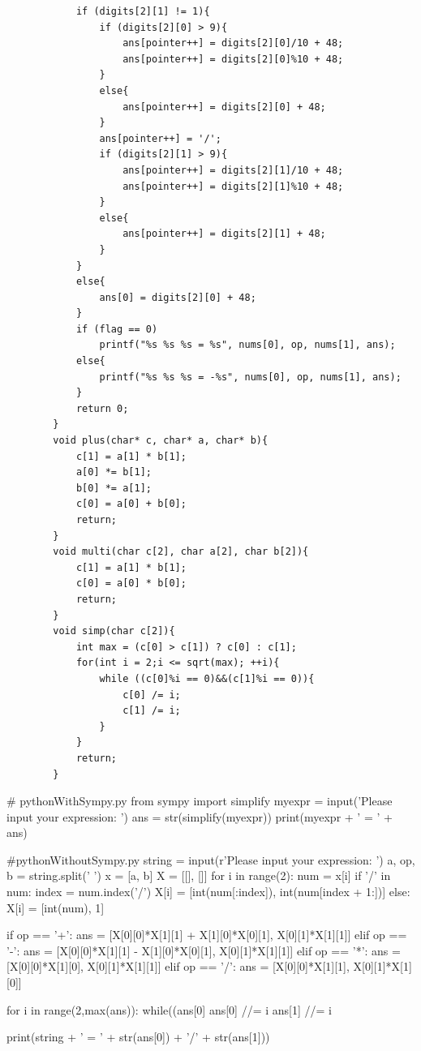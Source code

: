 \documentclass{article}
\begin{document}
\begin{appendices}
\begin{lstlisting}
            if (digits[2][1] != 1){
                if (digits[2][0] > 9){
                    ans[pointer++] = digits[2][0]/10 + 48;
                    ans[pointer++] = digits[2][0]%10 + 48;
                }
                else{
                    ans[pointer++] = digits[2][0] + 48;
                }
                ans[pointer++] = '/';
                if (digits[2][1] > 9){
                    ans[pointer++] = digits[2][1]/10 + 48;
                    ans[pointer++] = digits[2][1]%10 + 48;
                }
                else{
                    ans[pointer++] = digits[2][1] + 48;
                }
            }
            else{
                ans[0] = digits[2][0] + 48;
            }
            if (flag == 0)
                printf("%s %s %s = %s", nums[0], op, nums[1], ans);
            else{
                printf("%s %s %s = -%s", nums[0], op, nums[1], ans);
            }
            return 0;
        }
        void plus(char* c, char* a, char* b){
            c[1] = a[1] * b[1];
            a[0] *= b[1];
            b[0] *= a[1];
            c[0] = a[0] + b[0];
            return;
        }
        void multi(char c[2], char a[2], char b[2]){
            c[1] = a[1] * b[1];
            c[0] = a[0] * b[0];
            return;
        }
        void simp(char c[2]){
            int max = (c[0] > c[1]) ? c[0] : c[1];
            for(int i = 2;i <= sqrt(max); ++i){
                while ((c[0]%i == 0)&&(c[1]%i == 0)){
                    c[0] /= i;
                    c[1] /= i;
                }
            }
            return;
        }
        \end{lstlisting}
    \begin{python}
        # pythonWithSympy.py
        from sympy import simplify
        myexpr = input('Please input your expression: ')
        ans = str(simplify(myexpr))
        print(myexpr + ' = ' + ans)
    \end{python}
    \begin{python}
        #pythonWithoutSympy.py
        string = input(r'Please input your expression: ')
        a, op, b = string.split(' ')
        x = [a, b]
        X = [[], []]
        for i in range(2):
        num = x[i]
        if '/' in num:
        index = num.index('/')
        X[i] = [int(num[:index]), int(num[index + 1:])]
        else:
        X[i] = [int(num), 1]

        if op == '+':
        ans = [X[0][0]*X[1][1] + X[1][0]*X[0][1], X[0][1]*X[1][1]]
        elif op == '-':
        ans = [X[0][0]*X[1][1] - X[1][0]*X[0][1], X[0][1]*X[1][1]]
        elif op == '*':
        ans = [X[0][0]*X[1][0], X[0][1]*X[1][1]]
        elif op == '/':
        ans = [X[0][0]*X[1][1], X[0][1]*X[1][0]]

        for i in range(2,max(ans)):
        while((ans[0]%
        ans[0] //= i
        ans[1] //= i

        print(string + ' = ' + str(ans[0]) + '/' + str(ans[1]))
    \end{python}
\end{appendices}
\end{document}
